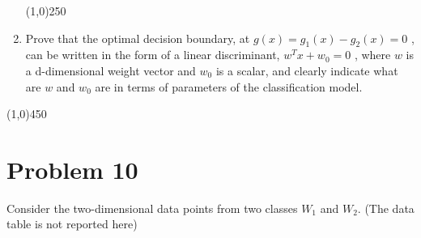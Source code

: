 \documentclass[12pt]{article}
\begin{document}
\begin{enumerate}
\begin{center}
\line(1,0){250}
\end{center}


\item Prove that the optimal decision boundary, at $g ( x ) = g_1 ( x ) - g_2 ( x ) = 0$ , can be written in the form of a linear discriminant, $w^Tx + w_0 = 0$ , where $w$ is a d-dimensional weight vector and $w_0$ is a scalar, and clearly indicate what are $w$ and $w_0$ are in terms of
parameters of the classification model.\\



\end{enumerate}


\begin{center}
\line(1,0){450}
\end{center}


\section{Problem 10}
Consider the two-dimensional data points from two classes $W_1$ and $W_2$. (The data table is not reported here)
\end{document}
